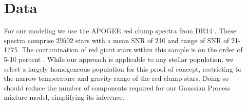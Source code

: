 \documentclass[a4paper,fleqn,usenatbib]{mnras}
\begin{document}










\section{Data}
\label{sec:data}

For our modeling we use the APOGEE red clump spectra from DR14 \citep{Majewski2017, Bovy2015}. These spectra comprise $29502$ stars with a mean SNR of 210 and range of SNR of 21-1775.  The contamination of red giant stars within this sample is on the order of 5-10 percent \citep{Bovy2015}. %
While our approach is applicable to any stellar population, we select a largely homogeneous population for this proof of concept, restricting to the narrow temperature and gravity range of the red clump stars. Doing so should reduce the number of components required for our Gaussian Process mixture model, simplifying its inference.



\end{document}
